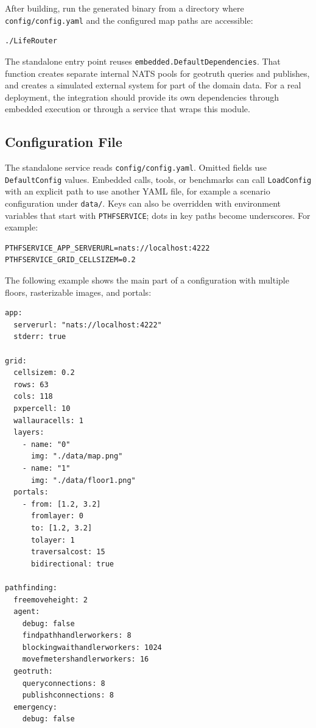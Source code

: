 \documentclass[12pt,a4paper]{report}
\begin{document}
After building, run the generated binary from a directory where
\texttt{config/config.yaml} and the configured map paths are accessible:

\begin{lstlisting}
./LifeRouter
\end{lstlisting}

The standalone entry point reuses \texttt{embedded.DefaultDependencies}. That
function creates separate internal NATS pools for geotruth queries and
publishes, and creates a simulated external system for part of the domain data.
For a real deployment, the integration should provide its own dependencies
through embedded execution or through a service that wraps this module.

\subsection{Configuration File}

The standalone service reads \texttt{config/config.yaml}. Omitted fields use
\texttt{DefaultConfig} values. Embedded calls, tools, or benchmarks can call
\texttt{LoadConfig} with an explicit path to use another YAML file, for example a
scenario configuration under \texttt{data/}. Keys can also be overridden with
environment variables that start with \texttt{PTHFSERVICE}; dots in key paths
become underscores. For example:

\begin{lstlisting}
PTHFSERVICE_APP_SERVERURL=nats://localhost:4222
PTHFSERVICE_GRID_CELLSIZEM=0.2
\end{lstlisting}

The following example shows the main part of a configuration with multiple
floors, rasterizable images, and portals:

\begin{lstlisting}
app:
  serverurl: "nats://localhost:4222"
  stderr: true

grid:
  cellsizem: 0.2
  rows: 63
  cols: 118
  pxpercell: 10
  wallauracells: 1
  layers:
    - name: "0"
      img: "./data/map.png"
    - name: "1"
      img: "./data/floor1.png"
  portals:
    - from: [1.2, 3.2]
      fromlayer: 0
      to: [1.2, 3.2]
      tolayer: 1
      traversalcost: 15
      bidirectional: true

pathfinding:
  freemoveheight: 2
  agent:
    debug: false
    findpathhandlerworkers: 8
    blockingwaithandlerworkers: 1024
    movefmetershandlerworkers: 16
  geotruth:
    queryconnections: 8
    publishconnections: 8
  emergency:
    debug: false
\end{lstlisting}
\end{document}
